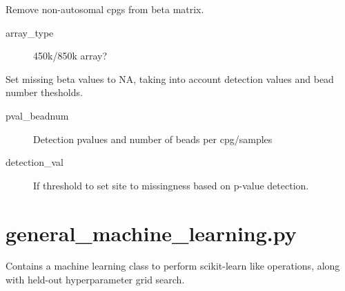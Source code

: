 \documentclass[letterpaper,10pt,english]{sphinxmanual}
\begin{document}

\begin{fulllineitems}
\label{\detokenize{index:pymethylprocess.meffil_functions.remove_sex}}
Remove non-autosomal cpgs from beta matrix.
\begin{description}
\item[{array\_type}] \leavevmode
450k/850k array?

\end{description}

\end{fulllineitems}


\begin{fulllineitems}
\label{\detokenize{index:pymethylprocess.meffil_functions.set_missing}}
Set missing beta values to NA, taking into account detection values and bead number thesholds.
\begin{description}
\item[{pval\_beadnum}] \leavevmode
Detection pvalues and number of beads per cpg/samples

\item[{detection\_val}] \leavevmode
If threshold to set site to missingness based on p-value detection.

\end{description}

\end{fulllineitems}

\label{\detokenize{index:module-pymethylprocess.general_machine_learning}}

\chapter{general\_machine\_learning.py}
\label{\detokenize{index:general-machine-learning-py}}
Contains a machine learning class to perform scikit-learn like operations, along with held-out hyperparameter grid search.
\end{document}
